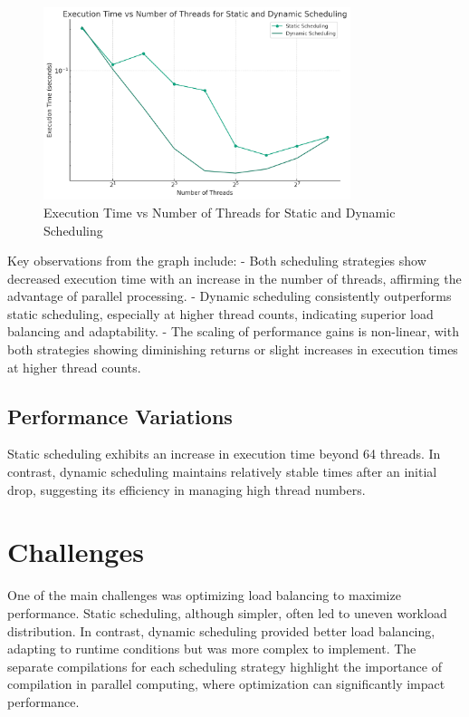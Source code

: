 \documentclass[11pt]{article}
\begin{document}
\begin{figure}[ht]
\centering
\includegraphics[width=0.8\textwidth]{./img/results.png}
\caption{Execution Time vs Number of Threads for Static and Dynamic
Scheduling}
\end{figure}

Key observations from the graph include: - Both scheduling strategies
show decreased execution time with an increase in the number of threads,
affirming the advantage of parallel processing. - Dynamic scheduling
consistently outperforms static scheduling, especially at higher thread
counts, indicating superior load balancing and adaptability. - The
scaling of performance gains is non-linear, with both strategies showing
diminishing returns or slight increases in execution times at higher
thread counts.

\hypertarget{performance-variations}{%
\subsection{Performance Variations}\label{performance-variations}}

Static scheduling exhibits an increase in execution time beyond 64
threads. In contrast, dynamic scheduling maintains relatively stable
times after an initial drop, suggesting its efficiency in managing high
thread numbers.

\hypertarget{challenges}{%
\section{Challenges}\label{challenges}}

One of the main challenges was optimizing load balancing to maximize
performance. Static scheduling, although simpler, often led to uneven
workload distribution. In contrast, dynamic scheduling provided better
load balancing, adapting to runtime conditions but was more complex to
implement. The separate compilations for each scheduling strategy
highlight the importance of compilation in parallel computing, where
optimization can significantly impact performance.
\end{document}
